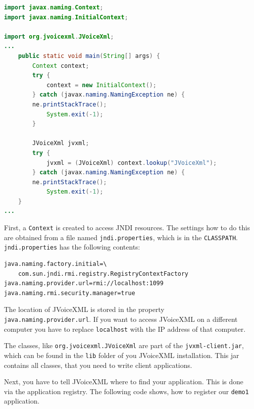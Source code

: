 \documentclass[11pt,a4paper]{article}
\begin{document}
\begin{lstlisting}[language=Java]
import javax.naming.Context;
import javax.naming.InitialContext;

import org.jvoicexml.JVoiceXml;
...
    public static void main(String[] args) {
        Context context;
        try {
            context = new InitialContext();
        } catch (javax.naming.NamingException ne) {
	    ne.printStackTrace();
            System.exit(-1);
        }

        JVoiceXml jvxml;
        try {
            jvxml = (JVoiceXml) context.lookup("JVoiceXml");
        } catch (javax.naming.NamingException ne) {
	    ne.printStackTrace();
            System.exit(-1);
    }
...
\end{lstlisting}

First, a \texttt{Context} is created to access JNDI resources.
The settings how to do this are obtained from a file named
\texttt{jndi.properties}, which is in the \texttt{CLASSPATH}.
\texttt{jndi.properties} has the following contents:

\begin{lstlisting}
java.naming.factory.initial=\
    com.sun.jndi.rmi.registry.RegistryContextFactory
java.naming.provider.url=rmi://localhost:1099
java.naming.rmi.security.manager=true
\end{lstlisting}

The location of JVoiceXML is stored in the property
\texttt{java.naming.pro\-vider.url}. If you want to access JVoiceXML on
a different computer you have to replace \texttt{localhost} with
the IP address of that computer.

The classes, like \texttt{org.jvoicexml.JVoiceXml} are part of the
\texttt{jvxml-client.jar}, which can be found in the \texttt{lib}
folder of you JVoiceXML installation.
This jar contains all classes, that you need to write client applications.

Next, you have to tell JVoiceXML where to find your application.
This is done via the application registry. The following code shows, how to 
register our \texttt{demo1} application.
\end{document}

